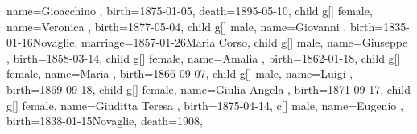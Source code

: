 \documentclass{article}
\begin{document}
\begin{midpage}
\begin{center}
\begin{genealogypicture}
{{{{{                    name={Gioacchino },
                    birth={1875-01-05}{},
                    death={1895-05-10}{},
                }
            }
            child{
                g[]{
                    female,
                    name={Veronica },
                    birth={1877-05-04}{},
                }
            }
        }
        child{
            g[]{
                male,
                name={Giovanni },
                birth={1835-01-16}{Novaglie},
                marriage={1857-01-26}{Maria Corso},
            }
            child{
                g[]{
                    male,
                    name={Giuseppe },
                    birth={1858-03-14}{},
                }
            }
            child{
                g[]{
                    female,
                    name={Amalia },
                    birth={1862-01-18}{},
                }
            }
            child{
                g[]{
                    female,
                    name={Maria },
                    birth={1866-09-07}{},
                }
            }
            child{
                g[]{
                    male,
                    name={Luigi },
                    birth={1869-09-18}{},
                }
            }
            child{
                g[]{
                    female,
                    name={Giulia Angela },
                    birth={1871-09-17}{},
                }
            }
            child{
                g[]{
                    female,
                    name={Giuditta Teresa },
                    birth={1875-04-14}{},
                }
            }
        }
        c[]{
            male,
            name={Eugenio },
            birth={1838-01-15}{Novaglie},
            death={1908}{},
        }
    }
}
\end{genealogypicture}

\end{center}
\end{midpage}
\end{document}
